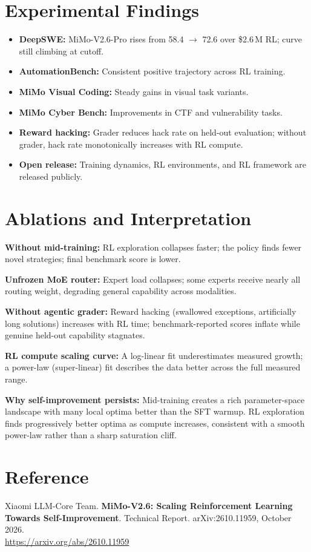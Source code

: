 \documentclass[10pt,twocolumn]{article}
\begin{document}
\section{Experimental Findings}

\begin{itemize}[itemsep=2pt,parsep=0pt]
  \item \textbf{DeepSWE:} MiMo-V2.6-Pro rises from 58.4 $\to$ 72.6 over
    \$2.6\,M RL; curve still climbing at cutoff.
  \item \textbf{AutomationBench:} Consistent positive trajectory across RL training.
  \item \textbf{MiMo Visual Coding:} Steady gains in visual task variants.
  \item \textbf{MiMo Cyber Bench:} Improvements in CTF and vulnerability tasks.
  \item \textbf{Reward hacking:} Grader reduces hack rate on held-out evaluation;
    without grader, hack rate monotonically increases with RL compute.
  \item \textbf{Open release:} Training dynamics, RL environments, and RL framework
    are released publicly.
\end{itemize}

\section{Ablations and Interpretation}

\textbf{Without mid-training:} RL exploration collapses faster; the policy finds
fewer novel strategies; final benchmark score is lower.

\textbf{Unfrozen MoE router:} Expert load collapses; some experts receive nearly all
routing weight, degrading general capability across modalities.

\textbf{Without agentic grader:} Reward hacking (swallowed exceptions, artificially
long solutions) increases with RL time; benchmark-reported scores inflate while
genuine held-out capability stagnates.

\textbf{RL compute scaling curve:} A log-linear fit underestimates measured growth;
a power-law (super-linear) fit describes the data better across the full measured
range.

\textbf{Why self-improvement persists:} Mid-training creates a rich parameter-space
landscape with many local optima better than the SFT warmup. RL exploration finds
progressively better optima as compute increases, consistent with a smooth power-law
rather than a sharp saturation cliff.

\section*{Reference}

Xiaomi LLM-Core Team.
\textbf{MiMo-V2.6: Scaling Reinforcement Learning Towards Self-Improvement}.
Technical Report. arXiv:2610.11959, October 2026.\\
\url{https://arxiv.org/abs/2610.11959}
\end{document}
